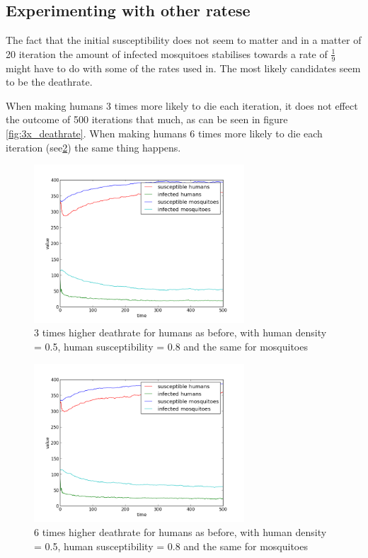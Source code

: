 \documentclass[a4paper]{report}
\begin{document}
\FloatBarrier
\subsection{Experimenting with other ratese}
The fact that the initial susceptibility does not seem to matter and in a matter
of 20 iteration the amount of infected mosquitoes stabilises towards a rate of
$\frac{1}{9}$ might have to do with some of the rates used in. The most likely
candidates seem to be the deathrate.

When making humans 3 times more likely to die each iteration, it does not effect
the outcome of 500 iterations that much, as can be seen in figure
\ref{fig:3x_deathrate}. When making humans 6 times more likely to die each iteration
(see\ref{fig:2_more_mosquitoes}) the same thing
happens.

\begin{figure}[htbp]
    \centering
    \includegraphics[width=0.7\textwidth]{05_08_05_08_higher_deathrate.png}
    \caption{3 times higher deathrate for humans as before, with human density =
        0.5, human susceptibility = 0.8 and the same for mosquitoes
    }
    \label{fig:more_mosquitoes}
\end{figure}

\begin{figure}[htbp]
    \centering
    \includegraphics[width=0.7\textwidth]{05_08_05_08_higher_deathrate_6x.png}
    \caption{6 times higher deathrate for humans as before, with human density =
        0.5, human susceptibility = 0.8 and the same for mosquitoes
    }
    \label{fig:2_more_mosquitoes}
\end{figure}
\end{document}
